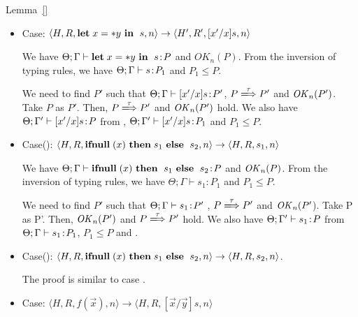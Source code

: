 \begin{pfof}{Lemma~\ref{}}
\begin{itemize}
  We need to find $P'$ such that \(\Theta; \Gamma' \vdash [x'/x]s\COL P'\),
  \(P \xLongrightarrow{\tau} P'\) and \(\OK_n(P')\).  Take \(P\) as
  \(P'\).  Then, \(P \xLongrightarrow{\tau} P'\) and \(\OK_n(P')\) hold.  We
  also have \(\Theta; \Gamma \vdash [x'/x]s\COL P\) from ,
  \(\Theta; \Gamma \vdash [x'/x]s\COL P_{1}\)\( P_{1} \le
  P\). 

\item Case: $\langle H, R, \mathbf{let}\; x = *y \ \mathbf{in}\; \ s, n \rangle
  \rightarrow \langle H', R', [x'/x]s, n \rangle $

  We have \(\Theta; \Gamma \vdash \mathbf{let}\; x = *y \ \mathbf{in}\; \ s\!:\!  P\) and
  \(OK_{n}(P)\). From the inversion of typing rules, we have \(\Theta;
  \Gamma \vdash s\!:\! P_{1}\) and \(P_{1} \le P\).

  We need to find \(P'\) such that \(\Theta; \Gamma \vdash [x'/x]s\!:\!
  P'\), \(P \xLongrightarrow{\tau} P'\) and \(\OK_n(P')\). Take \(P\) as
  \(P'\). Then, \(P \xLongrightarrow{\tau} P'\) and \(\OK_n(P')\) hold.  We
  also have \(\Theta; \Gamma' \vdash [x'/x]s\!:\! P\) from ,
  \(\Theta; \Gamma' \vdash [x'/x]s\!:\! P_{1}\) and \(P_{1} \le P\).
        
\item Case(): \(\langle H, R, \IFNULL \Cirx \ \THEN s_{1} \ \ELSE \ s_{2},
  n \rangle \rightarrow \langle H, R, s_{1}, n \rangle\)

  We have \(\Theta; \Gamma \vdash \mathbf{ifnull}\; (x) \ \mathbf{then}\; \ s_{1}
  \ \mathbf{else}\; \ s_{2}\!:\! P\) and \(\mathit{OK}_{n}(P)\). From the inversion of
  typing rules, we have \(\Theta; \Gamma \vdash s_{1} : P_{1}\) and \(P_{1}
  \le P\).

  We need to find $P'$ such that \(\Theta; \Gamma \vdash s_1\!:\! P'\)
  , \(P \xLongrightarrow{\tau} P'\) and \(\mathit{OK}_n(P'\)).  Take P as P'.  Then,
  \(\OK_n(P')\) and \(P \xLongrightarrow{\tau} P'\) hold. We also have \(\Theta;
  \Gamma' \vdash s_{1}\!:\! P\) from \(\Theta; \Gamma \vdash s_{1}\!:\!
  P_1\), \(P_{1} \le P\) and .

\item Case(): \(\langle H, R, \IFNULL \Cirx \ \THEN s_{1} \ \ELSE \ s_{2},
  n \rangle \rightarrow \langle H, R, s_{2}, n \rangle\).

 The proof is similar to case . 

\item Case: $\langle H, R, f(\vec{x}) , n \rangle \rightarrow  \langle H, R, [\vec{x}/\vec{y}]s, n  \rangle $


\end{itemize}
\end{pfof}
